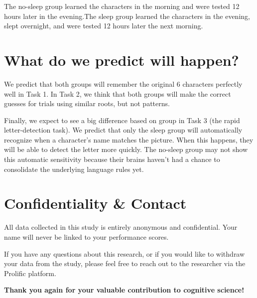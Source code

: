 \documentclass[12pt]{article}
\begin{document}
	\ex The no-sleep group learned the characters in the morning and were tested 12 hours later in the evening.\xe \ex The sleep group learned the characters in the evening, 
	slept overnight, and were tested 12 hours later the next morning. \xe

\section{What do we predict will happen?} We predict that both groups will remember the original 6 characters perfectly well in Task 1. In Task 2, we think that both groups will 
make the correct guesses for trials using similar roots, but not patterns.

Finally, we expect to see a big difference based on group in Task 3 (the rapid letter-detection task). We predict that only the sleep group will automatically recognize when a 
character's name matches the picture. When this happens, they will be able to detect the letter more quickly. The no-sleep group may not show this automatic sensitivity because 
their brains haven't had a chance to consolidate the underlying language rules yet.

\section{Confidentiality \& Contact}

All data collected in this study is entirely anonymous and confidential. Your name will never be linked to your performance scores.

If you have any questions about this research, or if you would like to withdraw your data from the study, please feel free to reach out to the researcher via the Prolific 
platform.

\textbf{Thank you again for your valuable contribution to cognitive science!} 
\end{document}

